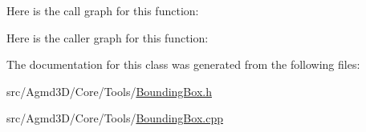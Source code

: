 Here is the call graph for this function\+:




Here is the caller graph for this function\+:




The documentation for this class was generated from the following files\+:\begin{DoxyCompactItemize}
\item 
src/\+Agmd3\+D/\+Core/\+Tools/\hyperlink{_bounding_box_8h}{Bounding\+Box.\+h}\item 
src/\+Agmd3\+D/\+Core/\+Tools/\hyperlink{_bounding_box_8cpp}{Bounding\+Box.\+cpp}\end{DoxyCompactItemize}
